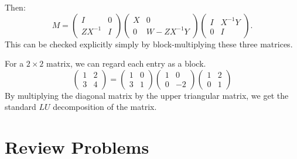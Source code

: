 Then: \[M=\begin{pmatrix}
I &  0 \\
ZX^{-1} & I
\end{pmatrix}\begin{pmatrix}
X & 0 \\
0 & W-ZX^{-1}Y
\end{pmatrix}\begin{pmatrix}
I & X^{-1}Y \\
0 & I
\end{pmatrix}.\]
This can be checked explicitly simply by block-multiplying these three matrices.


\begin{example}
For a $2\times 2$ matrix, we can regard each entry as a block.
\[
\begin{pmatrix}
1 & 2 \\
3 & 4
\end{pmatrix}=
\begin{pmatrix}
1 & 0 \\
3 & 1
\end{pmatrix}
\begin{pmatrix}
1 & 0 \\
0 & -2
\end{pmatrix}
\begin{pmatrix}
1 & 2 \\
0 & 1
\end{pmatrix}
\]
By multiplying the diagonal matrix by the upper triangular matrix, we get the standard $LU$ decomposition of the matrix.
\end{example}



\section{Review Problems}


\newpage
